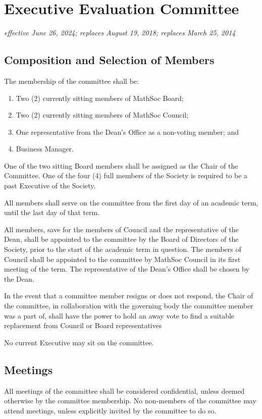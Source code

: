 \section{Executive Evaluation Committee}
\emph{effective June 26, 2024; replaces August 19, 2018; replaces March 25, 2014}

\subsection{Composition and Selection of Members}
The membership of the committee shall be:
\begin{enumerate}
	\item Two (2) currently sitting members of MathSoc Board;
	\item Two (2) currently sitting members of MathSoc Council;
	\item One representative from the Dean's Office as a non-voting member; and
	\item Business Manager.
\end{enumerate}

One of the two sitting Board members shall be assigned as the Chair of the Committee.
One of the four (4) full members of the Society is required to be a past Executive of the Society.

All members shall serve on the committee from the first day of an academic
term, until the last day of that term.

All members, save for the members of Council and the representative of the
Dean, shall be appointed to the committee by the Board of Directors of the
Society, prior to the start of the academic term in question. The members of
Council shall be appointed to the committee by MathSoc Council in its first
meeting of the term. The representative of the Dean's Office shall be chosen by
the Dean.

In the event that a committee member resigns or does not respond, the Chair of the committee, in collaboration with the governing body the committee member was a part of, shall have the power to hold an away vote to find a suitable replacement from Council or Board representatives

No current Executive may sit on the committee.

\subsection{Meetings}

All meetings of the committee shall be considered confidential, unless deemed
otherwise by the committee membership. No non-members of the committee may
attend meetings, unless explicitly invited by the committee to do so.

